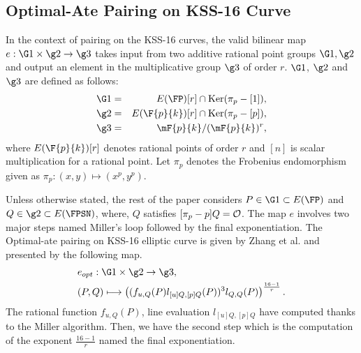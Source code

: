 \subsection{Optimal-Ate Pairing on KSS-16 Curve}
In the context of pairing on the KSS-16 curves, the valid bilinear map $e:\G1 \times \g2 \rightarrow \g3$ takes input from two additive rational point groups $\G1, \g2$ 
and output an element in the multiplicative group $\g3$ of order $r$. 
$\G1$, $\g2$ and $\g3$ are defined as follows:
\begin{eqnarray}\label{eq:g1}
\G1 & = &  E(\FP) [r] \cap \text{Ker}(\pi_p - [1]), \nonumber \\
\g2 & = &  E(\F{p}{k}) [r] \cap \text{Ker}(\pi_p - [p]), \nonumber \\
\g3 & = & \mF{p}{k}/(\mF{p}{k})^r, \nonumber
\end{eqnarray}
where $E(\F{p}{k})[r]$ denotes rational points of order $r$ and $[n]$ is scalar multiplication for a rational point. 
Let $\pi_p$ denotes the Frobenius endomorphism given as $\pi_p: (x,y) \mapsto (x^p,y^p)$.

Unless otherwise stated, the rest of the paper considers $P \in \G1 \subset E(\FP)$ and  $Q \in \g2 \subset  E(\FPSN)$, where, $Q$ satisfies $[\pi_p -p]Q = \cal O$.
The map $e$ involves two major steps named Miller's loop followed by the final exponentiation.
The Optimal-ate pairing \cite{op_ate_p} on KSS-16 elliptic curve is given by Zhang et al. \cite{zhang_L12} and presented by the following map.
\begin{align}
 & e_{opt}: \G1\times \g2 \rightarrow  \g3, \\
&  (P,Q) \longmapsto \left(( f_{u,Q}(P)l_{[u]Q,[p]Q}(P))^{3}l_{Q,Q}(P)\right)^{\frac{{16}-1}{r}}.
\end{align}
The rational function $f_{u,Q}(P)$, line evaluation $l_{[u]Q,[p]Q}$ have computed thanks to the Miller algorithm. 
Then, we have the second step which is the computation of the exponent $\frac{{16}-1}{r}$ named the final exponentiation.

